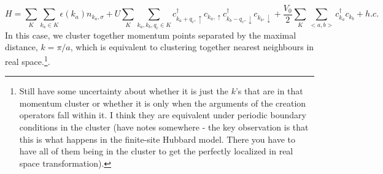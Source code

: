 \documentclass[12pt]{article}
\numberwithin{equation}{section}
\begin{document}
\begin{equation}
    \label{eq:hubbard_cluster_H}
    H=\sum_{K}\sum_{k_a\in K}\epsilon(k_a)n_{k_a,\sigma}
    +U\sum_{K}\sum_{k_a,k_b,q_c\in K}
    c^\dagger_{k_a+q_c,\uparrow}c_{k_a,\uparrow}
    c^\dagger_{k_b-q_c,\downarrow}c_{k_b,\downarrow}
    +\frac{V_0}{2}\sum_{K}\sum_{<a,b>}c^\dagger_{k_a}c_{k_b}+h.c.
\end{equation}
In this case, we cluster together momentum points separated by the maximal distance, $k=\pi/a$, which is equivalent to clustering together nearest neighbours in real space.\footnote{Still have some uncertainty about whether it is just the $k$'s that are in that momentum cluster or whether it is only when the arguments of the creation operators fall within it. I think they are equivalent under periodic boundary conditions in the cluster (have notes somewhere - the key observation is that this is what happens in the finite-site Hubbard model. There you have to have all of them being in the cluster to get the perfectly localized in real space transformation).}.
\end{document}
